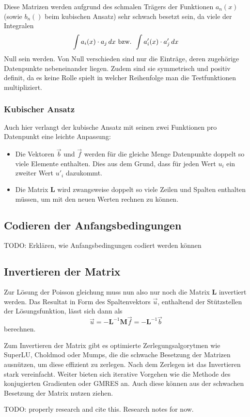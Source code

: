 Diese Matrizen werden aufgrund des schmalen Trägers der Funktionen $a_n(x)$ (sowie $b_n()$ beim kubischen Ansatz) sehr schwach besetzt sein, da viele der Integralen
\begin{equation}
    \int a_i(x) \cdot a_j \, d x \mbox{ bzw. } \int a'_i(x) \cdot a'_j \, d x 
\end{equation}
Null sein werden.
Von Null verschieden sind nur die Einträge, deren zugehörige Datenpunkte nebeneinander liegen.
Zudem sind sie symmetrisch und positiv definit, da es keine Rolle spielt in welcher Reihenfolge man die Testfunktionen multipliziert.

\subsubsection{Kubischer Ansatz}
Auch hier verlangt der kubische Ansatz mit seinen zwei Funktionen pro Datenpunkt eine leichte Anpassung: 
\begin{itemize}
    \item Die Vektoren $\vec{b}$ und $\vec{f}$ werden für die gleiche Menge Datenpunkte doppelt so viele Elemente enthalten.
          Dies aus dem Grund, dass für jeden Wert $u_i$ ein zweiter Wert $u'_i$ dazukommt.
    \item Die Matrix $\mathbf{L}$ wird zwangsweise doppelt so viele Zeilen und Spalten enthalten müssen, um mit den neuen Werten rechnen zu können. %
\end{itemize}


\subsection{Codieren der Anfangsbedingungen}
TODO: Erklären, wie Anfangsbedingungen codiert werden können


\subsection{Invertieren der Matrix\label{fem:1d:invertieren_matrix}}
Zur Lösung der Poisson gleichung muss nun also nur noch die Matrix $\mathbf{L}$ invertiert werden.
Das Resultat in Form des Spaltenvektors $\vec{u}$, enthaltend der Stützstellen der Lösungsfunktion, lässt sich dann als
\begin{equation}
    \vec{u} = - \mathbf{L}^{-1}\mathbf{M}\vec{f} = - \mathbf{L}^{-1}\vec{b}
\end{equation}
berechnen.

Zum Invertieren der Matrix gibt es optimierte Zerlegungsalgorytmen wie SuperLU, Choldmod oder Mumps, die die schwache Besetzung der Matrizen ausnützen, um diese effizient zu zerlegen.
Nach dem Zerlegen ist das Invertieren stark vereinfacht.
Weiter bieten sich iterative Vorgehen wie die Methode des konjugierten Gradienten oder GMRES an.
Auch diese können aus der schwachen Besetzung der Matrix nutzen ziehen.

TODO: properly research and cite this. Research notes for now.
